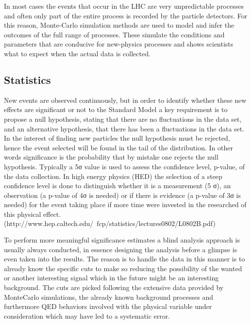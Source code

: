 \documentclass[runningheads,a4paper]{llncs}
\begin{document}
In most cases the events that occur in the LHC are very unpredictable processes and often only part of the entire process is recorded by the particle detectors. For this reason, Monte-Carlo simulation methods are used to model and infer the outcomes of the full range of processes. These simulate the conditions and parameters that are conducive for new-physics processes and shows scientists what to expect when the actual data is collected.



\subsection{Statistics}

New events are observed continuously, but in order to identify whether these new effects are significant or not to the Standard Model a key requirement is to propose a null hypothesis, stating that there are no fluctuations in the data set, and an alternative hypothesis, that there has been a fluctuations in the data set. In the interest of finding new particles the null hypothesis must be rejected, hence the event selected will be found in the tail of the distribution. In other words significance is the probability that by mistake one rejects the null hypothesis. Typically a 5σ value is used to assess the confidence level, p-value, of the data collection. In high energy physics (HED) the selection of a steep confidence level is done to distinguish whether it is a measurement (5 σ), an observation (a p-value of 4σ is needed) or if there is evidence (a p-value of 3σ is needed) for the event taking place if more time were invested in the researched of this physical effect. (http://www.hep.caltech.edu/~fcp/statistics/lectures0802/L0802B.pdf)

To perform more meaningful significance estimates a blind analysis approach is usually always conducted, in essence designing the analysis before a glimpse is even taken into the results. The reason is to handle the data in this manner is to already know the specific cuts to make so reducing the possibility of the wanted or another interesting signal which in the future might be an interesting background.  The cuts are picked following the extensive data provided by MonteCarlo simulations, the already known background processes and furthermore QED behaviors involved with the physical variable under consideration which may have led to a systematic error.
 
\end{document}
